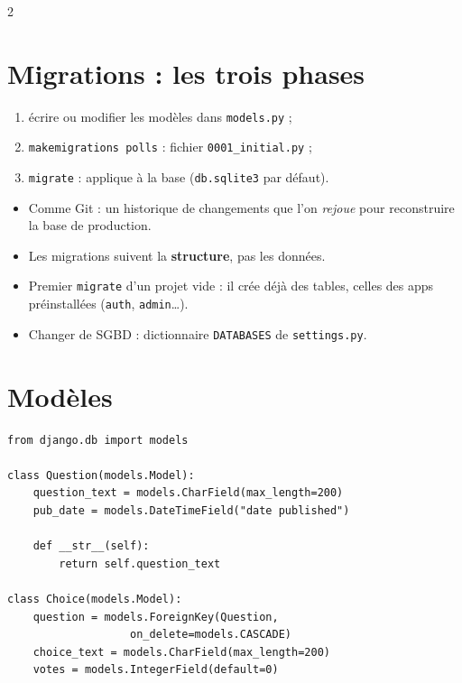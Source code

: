 \documentclass[a4paper,10pt]{article}
\newcommand{\co}[1]{\texttt{\textcolor{codefg}{#1}}}
\begin{document}
\begin{multicols}{2}
\section{Migrations : les trois phases}

\begin{enumerate}[leftmargin=1.3em, itemsep=0.1em, topsep=0.2em]
  \item écrire ou modifier les modèles dans \co{models.py} ;
  \item \co{makemigrations polls} : fichier \co{0001\_initial.py} ;
  \item \co{migrate} : applique à la base (\co{db.sqlite3} par défaut).
\end{enumerate}

\begin{itemize}
  \item Comme Git : un historique de changements que l'on \emph{rejoue}
        pour reconstruire la base de production.
  \item Les migrations suivent la \textbf{structure}, pas les données.
  \item Premier \co{migrate} d'un projet vide : il crée déjà des tables,
        celles des apps préinstallées (\co{auth}, \co{admin}\dots).
  \item Changer de SGBD : dictionnaire \co{DATABASES} de \co{settings.py}.
\end{itemize}

\section{Modèles}

\begin{lstlisting}
from django.db import models

class Question(models.Model):
    question_text = models.CharField(max_length=200)
    pub_date = models.DateTimeField("date published")

    def __str__(self):
        return self.question_text

class Choice(models.Model):
    question = models.ForeignKey(Question,
                   on_delete=models.CASCADE)
    choice_text = models.CharField(max_length=200)
    votes = models.IntegerField(default=0)
\end{lstlisting}


\end{multicols}
\end{document}
